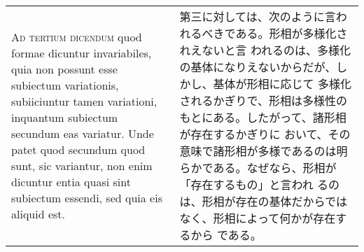 \documentclass[10pt]{jsarticle} %
\begin{document}
\begin{longtable}{p{21em}p{21em}}
\\

{\scshape Ad tertium dicendum} quod formae dicuntur invariabiles, quia
non possunt esse subiectum variationis, subiiciuntur tamen variationi,
inquantum subiectum secundum eas variatur. Unde patet quod secundum quod
sunt, sic variantur, non enim dicuntur entia quasi sint subiectum
essendi, sed quia eis aliquid est.

&

第三に対しては、次のように言われるべきである。形相が多様化されえないと言
われるのは、多様化の基体になりえないからだが、しかし、基体が形相に応じて
多様化されるかぎりで、形相は多様性のもとにある。したがって、諸形相が存在するかぎりに
おいて、その意味で諸形相が多様であるのは明らかである。なぜなら、形相が「存在するもの」と言われ
るのは、形相が存在の基体だからではなく、形相によって何かが存在するから
 である。



\end{longtable}
\end{document}
